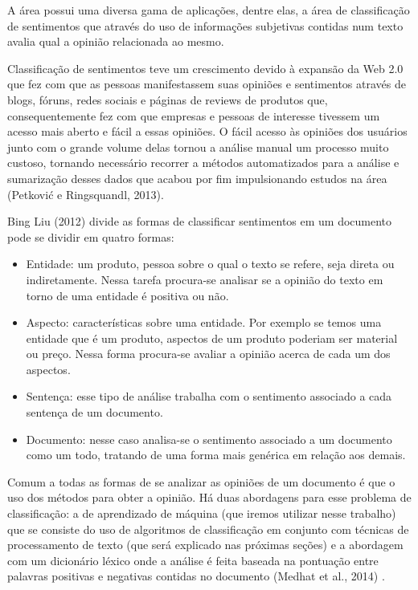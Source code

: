 A área possui uma diversa gama de aplicações, dentre elas, a área de classificação de sentimentos
que através do uso de informações subjetivas contidas num texto avalia qual a opinião relacionada
ao mesmo.

Classificação de sentimentos teve um crescimento devido à expansão da Web 2.0 que fez com que
as pessoas manifestassem suas opiniões e sentimentos através de blogs, fóruns, redes sociais
e páginas de reviews de produtos que, consequentemente fez com que empresas e pessoas de interesse
tivessem um acesso mais aberto e fácil a essas opiniões. O fácil acesso às opiniões dos usuários
junto com o grande volume delas tornou a análise manual um processo muito custoso, tornando
necessário recorrer a métodos automatizados para a análise e sumarização desses dados que
acabou por fim impulsionando estudos na área (Petković e Ringsquandl, 2013)\citep{petkovic2013}.

Bing Liu (2012)\cite{bingliu2012} divide as formas de classificar sentimentos 
em um documento pode se dividir em quatro formas:
\begin{itemize}
	\item Entidade:  um produto, pessoa sobre o qual o texto se refere, seja direta ou indiretamente.
	Nessa tarefa procura-se analisar se a opinião do texto em torno de uma entidade é positiva ou
	não.
	\item Aspecto: características sobre uma entidade. Por exemplo se temos uma entidade que é um
	produto, aspectos de um produto poderiam ser material ou preço. Nessa forma procura-se avaliar
	a opinião acerca de cada um dos aspectos.
	\item Sentença: esse tipo de análise trabalha com o sentimento associado a cada sentença de
	um documento.
	\item Documento: nesse caso analisa-se o sentimento associado a um documento como um todo, 
	tratando de uma forma mais genérica em relação aos demais.
\end{itemize}

Comum a todas as formas de se analizar as opiniões de um documento é que o uso dos métodos
para obter a opinião. Há duas abordagens para esse problema de classificação: a de aprendizado
de máquina (que iremos utilizar nesse trabalho) que se consiste do uso de algoritmos de 
classificação em conjunto com técnicas de processamento de texto (que será explicado nas próximas
seções) e a abordagem com um dicionário léxico onde a análise é feita baseada na pontuação
entre palavras positivas e negativas contidas no documento (Medhat et al., 2014) \citep{medhat2014}.

